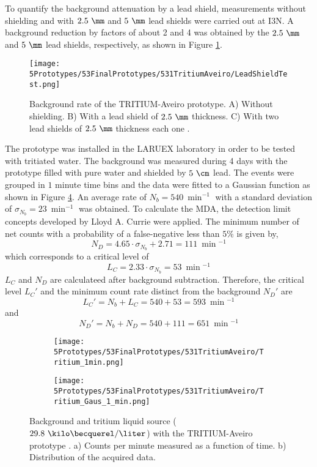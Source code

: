 To quantify the background attenuation by a lead shield, measurements without shielding and with $2.5~\mm$ and $5~\mm$ lead shields were carried out at I3N. A background reduction by factors of about 2 and 4 was obtained by the $2.5~\mm$ and $5~\mm$ lead shields, respectively, as shown in Figure \ref{fig:LeadShieldTest}.
\begin{figure}[h]
\centering
\texttt{[image: 5Prototypes/53FinalPrototypes/531TritiumAveiro/LeadShieldTest.png]}
\caption{Background rate of the TRITIUM-Aveiro prototype. A) Without shielding. B) With a lead shield of $2.5~\mm$ thickness. C) With two lead shields of $2.5~\mm$ thickness each one \cite{ExperimentalPaperCarlos}.\label{fig:LeadShieldTest}}
\end{figure}

The prototype was installed in the LARUEX laboratory in order to be tested with tritiated water. The background was measured during 4 days with the prototype filled with pure water and shielded by $5~\cm$ lead. The events were grouped in $1$ minute time bins and the data were fitted to a Gaussian function as shown in Figure \ref{fig:BackgroundTritium1min}. An average rate of $N_b = 540~\min^{-1}$ with a standard deviation of $\sigma_{N_b}=23~\min^{-1}$ was obtained. To calculate the MDA, the detection limit concepts developed by Lloyd A. Currie \cite{Knoll} were applied. The minimum number of net counts with a probability of a false-negative less than $5\%$ is given by,
\begin{equation}
N_D = 4.65 \cdot{}\sigma_{N_b} + 2.71 = 111~\min{}^{-1}
\label{eq:EquationNetCounts}
\end{equation}
which corresponds to a critical level of 
$$L_C = 2.33\cdot{}\sigma_{N_b}=53 ~\min{}^{-1}$$
$L_C$ and $N_D$ are calculateed after background subtraction. Therefore, the critical level $L_C'$ and the minimum count rate distinct from the background $N_D'$ are $$L_C'= N_b + L_C = 540 + 53 = 593~\min{}^{-1}$$ and $$N_D'= N_b + N_D = 540 + 111=651~\min{}^{-1}$$
\begin{figure}
\centering
    \begin{subfigure}[b]{0.55\textwidth}
    \centering
    \texttt{[image: 5Prototypes/53FinalPrototypes/531TritiumAveiro/Tritium\_1min.png]}  
    \caption{\label{subfig:MeasurementInRealTime}}
    \end{subfigure}
    \hfill
    \begin{subfigure}[b]{0.55\textwidth}
    \centering
    \texttt{[image: 5Prototypes/53FinalPrototypes/531TritiumAveiro/Tritium\_Gaus\_1\_min.png]}  
    \caption{\label{subfig:DistributionofMeasurement}}
    \end{subfigure}
 \caption{Background and tritium liquid source ($29.8~\kilo\becquerel/\liter$) with the TRITIUM-Aveiro prototype \cite{ExperimentalPaperCarlos}. a) Counts per minute measured as a function of time. b) Distribution of the acquired data.}
 \label{fig:BackgroundTritium1min}
\end{figure}
